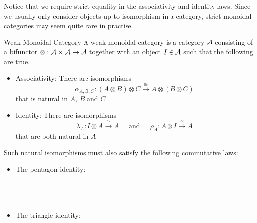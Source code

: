 \documentclass[a4paper]{article}
\begin{document}
Notice that we require strict equality in the associativity and identity laws. Since we usually only consider objects up to isomorphism in a category, strict monoidal categories may seem quite rare in practise. 

\begin{defn}{Weak Monoidal Category}{} A weak monoidal category is a category $\mathcal{A}$ consisting of a bifunctor $\otimes:\mathcal{A}\times\mathcal{A}\to\mathcal{A}$ together with an object $I\in\mathcal{A}$ such that the following are true. 
\begin{itemize}
\item Associativity: There are isomorphisms $$\alpha_{A,B,C}:(A\otimes B)\otimes C\overset{\cong}{\longrightarrow} A\otimes(B\otimes C)$$ that is natural in $A$, $B$ and $C$
\item Identity: There are isomorphisms $$\lambda_A:I\otimes A\overset{\cong}{\longrightarrow} A\;\;\;\;\text{ and }\;\;\;\;\rho_A:A\otimes I\overset{\cong}{\longrightarrow} A$$ that are both natural in $A$
\end{itemize}
Such natural isomorphisms must also satisfy the following commutative laws: 
\begin{itemize}
\item The pentagon identity: \\~\\
\\~\\
\item The triangle identity: \\~\\
\\~\\
\end{itemize}
\end{defn}
\end{document}
